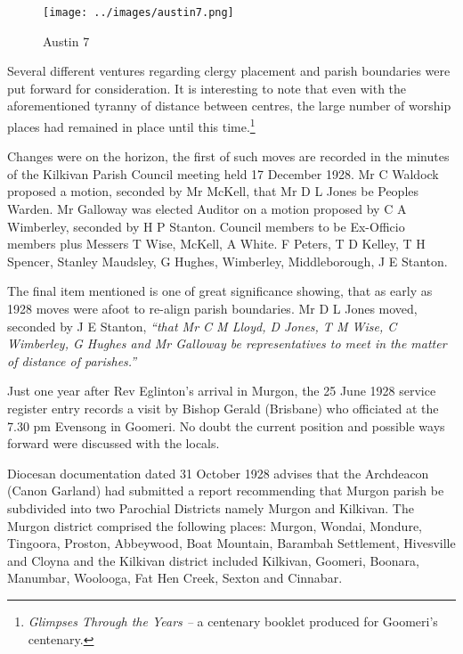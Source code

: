 \begin{figure}[!htb]
\begin{center}
\texttt{[image: ../images/austin7.png]}
\caption{Austin 7}
\end{center}
\end{figure}




Several different ventures regarding clergy placement and parish boundaries were put forward for consideration. It is interesting to note that even with the aforementioned tyranny of distance between centres, the large number of worship places had remained in place until this time.\footnote{\emph{Glimpses Through the Years --} a centenary booklet produced for Goomeri's centenary.}


Changes were on the horizon, the first of such moves are recorded in the minutes of the Kilkivan Parish Council meeting held 17 December 1928. Mr C Waldock proposed a motion, seconded by Mr McKell, that Mr D L Jones be Peoples Warden. Mr Galloway was elected Auditor on a motion proposed by C A Wimberley, seconded by H P Stanton. Council members to be Ex-Officio members plus Messers T Wise, McKell, A White. F Peters, T D Kelley, T H Spencer, Stanley Maudsley, G Hughes, Wimberley, Middleborough, J E Stanton.



The final item mentioned is one of great significance showing, that as early as 1928 moves were afoot to re-align parish boundaries. Mr D L Jones moved, seconded by J E Stanton, \emph{``that Mr C M Lloyd, D Jones, T M Wise, C Wimberley, G Hughes and Mr Galloway be representatives to meet in the matter of distance of parishes.''}



Just one year after Rev Eglinton's arrival in Murgon, the 25 June 1928 service register entry records a visit by Bishop Gerald (Brisbane) who officiated at the 7.30 pm Evensong in Goomeri. No doubt the current position and possible ways forward were discussed with the locals.



Diocesan documentation dated 31 October 1928 advises that the Archdeacon (Canon Garland) had submitted a report recommending that Murgon parish be subdivided into two Parochial Districts namely Murgon and Kilkivan. The Murgon district comprised the following places: Murgon, Wondai, Mondure, Tingoora, Proston, Abbeywood, Boat Mountain, Barambah Settlement, Hivesville and Cloyna and the Kilkivan district included Kilkivan, Goomeri, Boonara, Manumbar, Woolooga, Fat Hen Creek, Sexton and Cinnabar.



